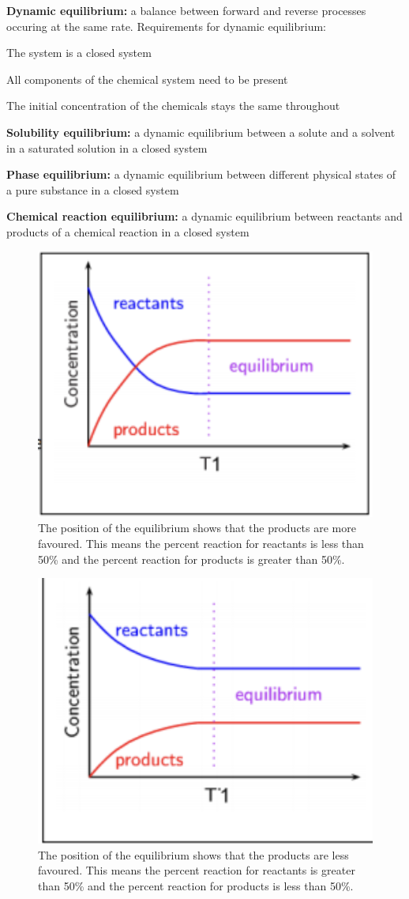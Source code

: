 \begin{bulleted-list}
    \item \textbf{Dynamic equilibrium:} a balance between forward and reverse processes occuring
        at the same rate. Requirements for dynamic equilibrium:
        \begin{enum}
            \item The system is a closed system
            \item All components of the chemical system need to be present
            \item The initial concentration of the chemicals stays the same throughout
        \end{enum}
    \item \textbf{Solubility equilibrium:} a dynamic equilibrium between a solute and a solvent
        in a saturated solution in a closed system
    \item \textbf{Phase equilibrium:} a dynamic equilibrium between different physical states of a
        pure substance in a closed system
    \item \textbf{Chemical reaction equilibrium:} a dynamic equilibrium between reactants and products
        of a chemical reaction in a closed system
\end{bulleted-list}

\begin{figure}[ht!]
    \centering
    \includegraphics[width=0.3 \textwidth]{../figures/chemical-reaction-equilibrium-1.png}
    \caption{The position of the equilibrium shows that the products are more favoured. This means
    the percent reaction for reactants is less than 50\% and the percent reaction for
    products is greater than 50\%.}
    \label{fig:chemical-reaction-equilibrium-1}
\end{figure}

\begin{figure}[ht!]
    \centering
    \includegraphics[width=0.3 \textwidth]{../figures/chemical-reaction-equilibrium-2.png}
    \caption{The position of the equilibrium shows that the products are less favoured. This means
    the percent reaction for reactants is greater than 50\% and the percent reaction for products
    is less than 50\%.}
    \label{fig:chemical-reaction-equilibrium-2}
\end{figure}

